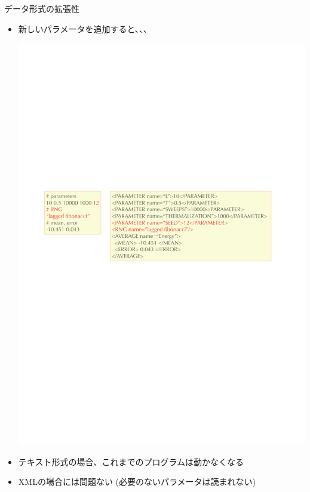 \begin{frame}{データ形式の拡張性}
  \begin{itemize}
  \item 新しいパラメータを追加すると、、、
  \begin{center}
    \includegraphics[width=.8\textwidth]{xml4.pdf}
  \end{center}
  \item テキスト形式の場合、これまでのプログラムは動かなくなる
  \item XMLの場合には問題ない (必要のないパラメータは読まれない)
  \end{itemize}
\end{frame}

\subsection*{\redb\whiteb\greenb}

